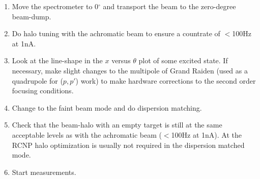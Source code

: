 \documentclass[11pt]{report}
\begin{document}
\begin{enumerate}
\item Move the spectrometer to 0$^{\circ}$ and transport the beam to the zero-degree beam-dump.
\item Do halo tuning with the achromatic beam to ensure a countrate of $<$100Hz at 1nA. 
\item Look at the line-shape in the $x$ versus $\theta$ plot of some excited state.
      If necessary, make slight changes to the multipole
      of Grand Raiden (used as a quadrupole for ($p,p'$) work)
      to make hardware corrections to the second order focusing conditions.
\item Change to the faint beam mode and do dispersion matching. 
\item Check that the beam-halo with an empty target is still at the same acceptable levels as with
      the achromatic beam ($<$100Hz at 1nA).
      At the RCNP halo optimization is usually not required in the dispersion
      matched mode.
\item Start measurements.
\end{enumerate}
\end{document}
